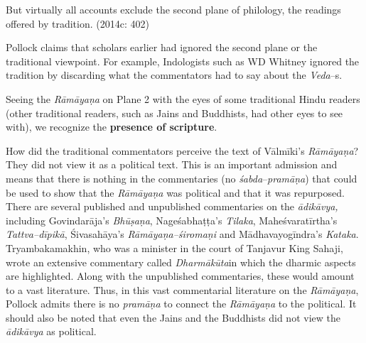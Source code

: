 \begin{myquote}
But virtually all accounts exclude the second plane of philology, the readings offered by tradition. (2014c: 402)
\end{myquote}

Pollock claims that scholars earlier had ignored the second plane or the traditional viewpoint. For example, Indologists such as WD Whitney ignored the tradition by discarding what the commentators had to say about the \textit{Veda}–s.

\begin{myquote}
Seeing the \textit{Rāmāyaṇa} on Plane 2 with the eyes of some traditional Hindu readers (other traditional readers, such as Jains and Buddhists, had other eyes to see with), we recognize the \textbf{presence of scripture}.
\end{myquote}

How did the traditional commentators perceive the text of Vālmīki’s \textit{Rāmāyaṇa}? They did not view it as a political text. This is an important admission and means that there is nothing in the commentaries (no\textit{ śabda}–\textit{pramāṇa}) that could be used to show that the \textit{Rāmāyaṇa }was political and that it was repurposed. There are several published and unpublished commentaries on the \textit{ādikāvya,} including Govindarāja’s \textit{Bhūṣaṇa}, Nageśabhaṭṭa’s \textit{Tilaka}, Maheśvaratīrtha’s \textit{Tattva–dīpikā}, Śivasahāya’s \textit{Rāmāyaṇa–śiromaṇi} and Mādhavayogīndra’s \textit{Kataka}. Tryambakamakhin, who was a minister in the court of Tanjavur King Sahaji, wrote an extensive commentary called \textit{Dharmākūta}in which the dharmic aspects are highlighted. Along with the unpublished commentaries, these would amount to a vast literature. Thus, in this vast commentarial literature on the \textit{Rāmāyaṇa}, Pollock admits there is no \textit{pramāṇa} to connect the \textit{Rāmāyaṇa }to the political. It should also be noted that even the Jains and the Buddhists did not view the\textit{ ādikāvya} as political.

